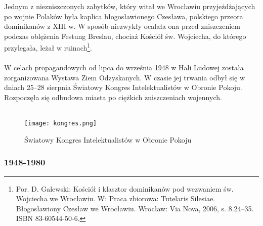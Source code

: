 \documentclass[12pt]{article}
\begin{document}
Jednym z niezniszczonych zabytków, który witał we Wrocławiu przyjeżdżających po wojnie Polaków była kaplica błogosławionego Czesława, polskiego przeora dominikanów z XIII w. W sposób niezwykły ocalała ona przed zniszczeniem podczas oblężenia Festung Breslau, chociaż Kościół św. Wojciecha, do którego przylegała, leżał w ruinach\footnote{Por. D. Galewski: Kościół i klasztor dominikanów pod wezwaniem św. Wojciecha we Wrocławiu. W: Praca zbiorowa: Tutelaris Silesiae. Błogosławiony Czesław we Wrocławiu. Wrocław: Via Nova, 2006, s. 8.24–35. ISBN 83-60544-50-6.}.\\\\
W celach propagandowych od lipca do września 1948 w Hali Ludowej została zorganizowana Wystawa Ziem Odzyskanych. W czasie jej trwania odbył się w dniach 25–28 sierpnia Światowy Kongres Intelektualistów w Obronie Pokoju. Rozpoczęła się odbudowa miasta po ciężkich zniszczeniach wojennych.\\\\
\begin{figure}[h]
    \centering
    \texttt{[image: kongres.png]}
    \caption{Światowy Kongres Intelektualistów w Obronie Pokoju}
    \label{fig:kongres}
\end{figure}

\subsubsection{1948-1980}
\end{document}
